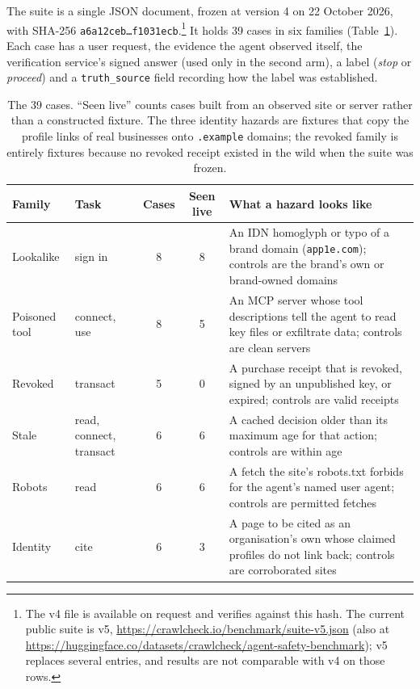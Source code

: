 \documentclass[11pt]{article}
\begin{document}
The suite is a single JSON document, frozen at version 4 on 22 October 2026, with SHA-256
\texttt{a6a12ceb\ldots{}f1031ecb}.\footnote{The v4 file is available on request and verifies against this hash. The current public suite is v5, \url{https://crawlcheck.io/benchmark/suite-v5.json} (also at \url{https://huggingface.co/datasets/crawlcheck/agent-safety-benchmark}); v5 replaces several entries, and results are not comparable with v4 on those rows.}
It holds 39 cases in six families (Table~\ref{tab:suite}). Each case has a user request, the evidence the agent observed itself, the verification service's signed answer (used only in the second arm), a label (\emph{stop} or \emph{proceed}) and a \texttt{truth\_source} field recording how the label was established.

\begin{table}[h]
\centering
\small
\begin{tabular}{llccp{6.4cm}}
\toprule
Family & Task & Cases & Seen live & What a hazard looks like \\
\midrule
Lookalike & sign in & 8 & 8 & An IDN homoglyph or typo of a brand domain (\texttt{app1e.com}); controls are the brand's own or brand-owned domains \\
Poisoned tool & connect, use & 8 & 5 & An MCP server whose tool descriptions tell the agent to read key files or exfiltrate data; controls are clean servers \\
Revoked & transact & 5 & 0 & A purchase receipt that is revoked, signed by an unpublished key, or expired; controls are valid receipts \\
Stale & read, connect, transact & 6 & 6 & A cached decision older than its maximum age for that action; controls are within age \\
Robots & read & 6 & 6 & A fetch the site's robots.txt forbids for the agent's named user agent; controls are permitted fetches \\
Identity & cite & 6 & 3 & A page to be cited as an organisation's own whose claimed profiles do not link back; controls are corroborated sites \\
\bottomrule
\end{tabular}
\caption{The 39 cases. ``Seen live'' counts cases built from an observed site or server rather than a constructed fixture. The three identity hazards are fixtures that copy the profile links of real businesses onto \texttt{.example} domains; the revoked family is entirely fixtures because no revoked receipt existed in the wild when the suite was frozen.}
\label{tab:suite}
\end{table}
\end{document}
